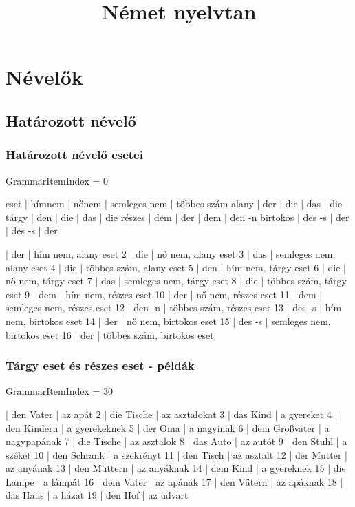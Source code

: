 \documentclass{article}
\title{Német nyelvtan}
\newenvironment{desc}{\verbatim}{\endverbatim}
\newenvironment{exmp}{\verbatim}{\endverbatim}
\begin{document}
\maketitle

\tableofcontents

\section{Névelők}

\subsection{Határozott névelő}

\subsubsection{Határozott névelő esetei}

GrammarItemIndex = 0

\begin{desc}
eset     | hímnem | nőnem | semleges nem | többes szám
alany    | der    | die   | das          | die
tárgy    | den    | die   | das          | die
részes   | dem    | der   | dem          | den -n
birtokos | des -s | der   | des -s       | der
\end{desc}

\begin{exmp}
1 | der | hím nem, alany eset
2 | die | nő nem, alany eset
3 | das | semleges nem, alany eset
4 | die | többes szám, alany eset
5 | den | hím nem, tárgy eset
6 | die | nő nem, tárgy eset
7 | das | semleges nem, tárgy eset
8 | die | többes szám, tárgy eset
9 | dem | hím nem, részes eset
10 | der | nő nem, részes eset
11 | dem | semleges nem, részes eset
12 | den -n | többes szám, részes eset
13 | des -s | hím nem, birtokos eset
14 | der | nő nem, birtokos eset
15 | des -s | semleges nem, birtokos eset
16 | der | többes szám, birtokos eset
\end{exmp}

\subsubsection{Tárgy eset és részes eset - példák}

GrammarItemIndex = 30

\begin{desc}
\end{desc}

\begin{exmp}
1 | den Vater | az apát
2 | die Tische | az asztalokat
3 | das Kind | a gyereket
4 | den Kindern | a gyerekeknek
5 | der Oma | a nagyinak
6 | dem Großvater | a nagypapának
7 | die Tische | az asztalok
8 | das Auto | az autót
9 | den Stuhl | a széket
10 | den Schrank | a szekrényt
11 | den Tisch | az asztalt
12 | der Mutter | az anyának
13 | den Müttern | az anyáknak
14 | dem Kind | a gyereknek
15 | die Lampe | a lámpát
16 | dem Vater | az apának
17 | den Vätern | az apáknak
18 | das Haus | a házat
19 | den Hof | az udvart
\end{exmp}
\end{document}
